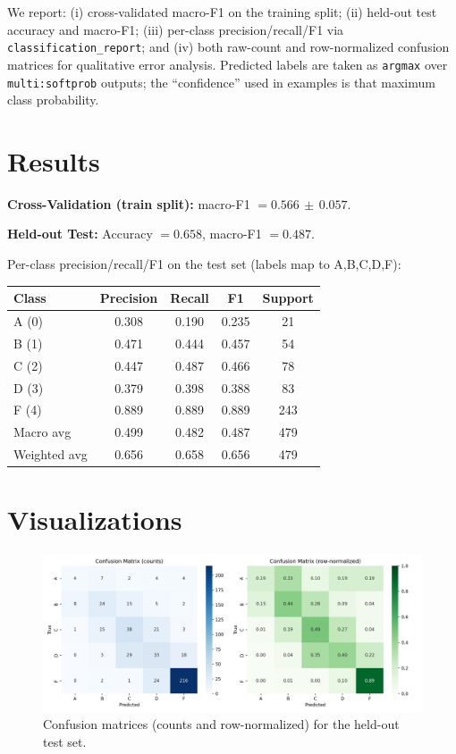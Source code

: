 \documentclass[11pt]{article}
\begin{document}
We report: (i) cross-validated macro-F1 on the training split; (ii) held-out test accuracy and macro-F1; (iii) per-class precision/recall/F1 via \texttt{classification\_report}; and (iv) both raw-count and row-normalized confusion matrices for qualitative error analysis. Predicted labels are taken as \texttt{argmax} over \texttt{multi:softprob} outputs; the ``confidence'' used in examples is that maximum class probability.

\section*{Results}
\textbf{Cross-Validation (train split):} macro-F1 $=0.566\,\pm\,0.057$.

\textbf{Held-out Test:} Accuracy $=0.658$, macro-F1 $=0.487$.

Per-class precision/recall/F1 on the test set (labels map to A,B,C,D,F):
\begin{center}
\begin{tabular}{l S S S S}
\toprule
Class & {Precision} & {Recall} & {F1} & {Support} \\
\midrule
A (0) & 0.308 & 0.190 & 0.235 & 21 \\
B (1) & 0.471 & 0.444 & 0.457 & 54 \\
C (2) & 0.447 & 0.487 & 0.466 & 78 \\
D (3) & 0.379 & 0.398 & 0.388 & 83 \\
F (4) & 0.889 & 0.889 & 0.889 & 243 \\
\midrule
Macro avg & 0.499 & 0.482 & 0.487 & 479 \\
Weighted avg & 0.656 & 0.658 & 0.656 & 479 \\
\bottomrule
\end{tabular}
\end{center}

\section*{Visualizations}
\begin{figure}[H]
  \centering
  \includegraphics[width=.9\textwidth]{../Checkpoint 2/figures/xgb_confusion_mats.png}
  \caption{Confusion matrices (counts and row-normalized) for the held-out test set.}
\end{figure}
\end{document}
